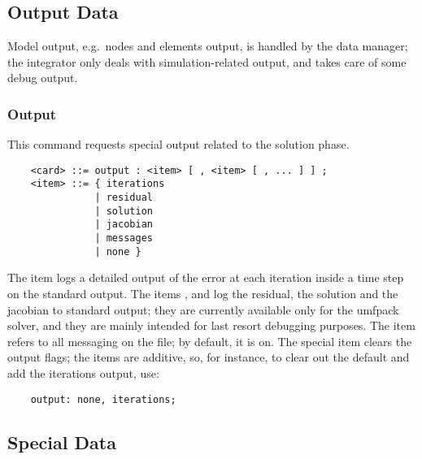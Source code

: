 \subsection{Output Data}
Model output, e.g.\ nodes and elements output, is handled
by the data manager; the integrator only deals with
simulation-related output, and takes care of some debug output.

\subsubsection{Output}
This command requests special output related to the solution phase.
\begin{verbatim}
    <card> ::= output : <item> [ , <item> [ , ... ] ] ;
    <item> ::= { iterations
               | residual
               | solution
               | jacobian
               | messages
               | none }
\end{verbatim}
The item  logs a detailed output of the error
at each iteration inside a time step 
on the standard output.
The items ,  and  log
the residual, the solution and the jacobian to standard output; they are
currently available only for the umfpack solver, and they are
mainly intended for last resort debugging purposes.
The item  refers to all messaging 
on the  file; by default, it is on.
The special item  clears the output flags; the items
are additive, so, for instance, to clear out the default 
and add the iterations output, use:
\begin{verbatim}
    output: none, iterations;
\end{verbatim}

\subsection{Special Data}
